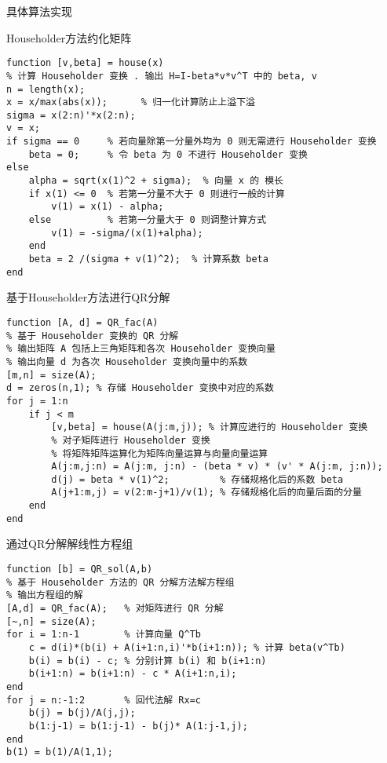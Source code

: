 \documentclass{article}
\begin{document}
\begin{section}{具体算法实现}
    \begin{subsection}{Householder方法约化矩阵}
        \begin{lstlisting}
function [v,beta] = house(x)
% 计算 Householder 变换 . 输出 H=I-beta*v*v^T 中的 beta, v
n = length(x);
x = x/max(abs(x));      % 归一化计算防止上溢下溢
sigma = x(2:n)'*x(2:n); 
v = x;
if sigma == 0     % 若向量除第一分量外均为 0 则无需进行 Householder 变换
    beta = 0;     % 令 beta 为 0 不进行 Householder 变换
else
    alpha = sqrt(x(1)^2 + sigma);  % 向量 x 的 模长
    if x(1) <= 0  % 若第一分量不大于 0 则进行一般的计算
        v(1) = x(1) - alpha;
    else          % 若第一分量大于 0 则调整计算方式
        v(1) = -sigma/(x(1)+alpha);
    end           
    beta = 2 /(sigma + v(1)^2);  % 计算系数 beta
end
        \end{lstlisting}
    \end{subsection}
    \begin{subsection}{基于Householder方法进行QR分解}
        \begin{lstlisting}
function [A, d] = QR_fac(A)
% 基于 Householder 变换的 QR 分解
% 输出矩阵 A 包括上三角矩阵和各次 Householder 变换向量 
% 输出向量 d 为各次 Householder 变换向量中的系数
[m,n] = size(A);
d = zeros(n,1); % 存储 Householder 变换中对应的系数
for j = 1:n
    if j < m    
        [v,beta] = house(A(j:m,j)); % 计算应进行的 Householder 变换
        % 对子矩阵进行 Householder 变换
        % 将矩阵矩阵运算化为矩阵向量运算与向量向量运算
        A(j:m,j:n) = A(j:m, j:n) - (beta * v) * (v' * A(j:m, j:n)); 
        d(j) = beta * v(1)^2;         % 存储规格化后的系数 beta
        A(j+1:m,j) = v(2:m-j+1)/v(1); % 存储规格化后的向量后面的分量
    end
end
        \end{lstlisting}
    \end{subsection}   
    \begin{subsection}{通过QR分解解线性方程组}
        \begin{lstlisting}
function [b] = QR_sol(A,b)
% 基于 Householder 方法的 QR 分解方法解方程组
% 输出方程组的解
[A,d] = QR_fac(A);   % 对矩阵进行 QR 分解
[~,n] = size(A);
for i = 1:n-1        % 计算向量 Q^Tb
    c = d(i)*(b(i) + A(i+1:n,i)'*b(i+1:n)); % 计算 beta(v^Tb)
    b(i) = b(i) - c; % 分别计算 b(i) 和 b(i+1:n)
    b(i+1:n) = b(i+1:n) - c * A(i+1:n,i);
end
for j = n:-1:2       % 回代法解 Rx=c
    b(j) = b(j)/A(j,j);
    b(1:j-1) = b(1:j-1) - b(j)* A(1:j-1,j);
end
b(1) = b(1)/A(1,1);
        \end{lstlisting}
    \end{subsection}  

\end{section}
\end{document}
